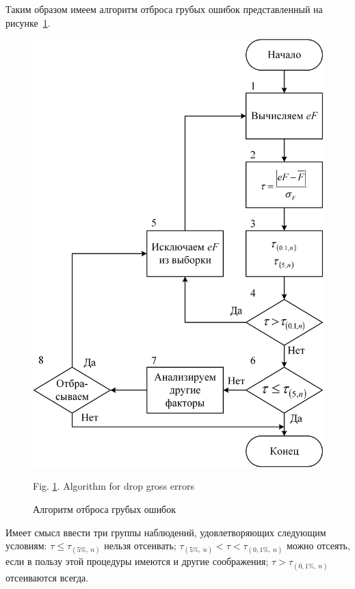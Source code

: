 Таким образом имеем алгоритм отброса грубых ошибок представленный на рисунке~\ref{fig:AlgDGE}.
\begin{figure}[!htb]
	\centering
	\includegraphics[scale=1.25]{images/DropGrossError}
	\caption{Алгоритм отброса грубых ошибок} 
	\label{fig:AlgDGE}
	Fig. \ref{fig:AlgDGE}. Algorithm for drop gross errors
\end{figure}
Имеет смысл ввести три группы наблюдений, удовлетворяющих следующим условиям: $ \tau \leqslant \tau_{(5\%,\ n)} $ нельзя отсеивать; $ \tau_{(5\%,\ n)} < \tau < \tau_{(0,1\%,\ n)} $ можно отсеять, если в пользу этой процедуры имеются и другие соображения; $ \tau > \tau_{(0,1\%,\ n)} $ отсеиваются всегда.
